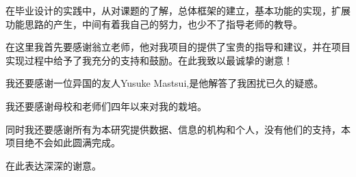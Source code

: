 
\acknowledgement

 
在毕业设计的实践中，从对课题的了解，总体框架的建立，基本功能的实现，扩展功能思路的产生，中间有着我自己的努力，也少不了指导老师的教导。

在这里我首先要感谢翁立老师，他对我项目的提供了宝贵的指导和建议，并在项目实现过程中给予了我充分的支持和鼓励。在此我致以最诚挚的谢意！

我还要感谢一位异国的友人Yusuke Mastsui,是他解答了我困扰已久的疑惑。

我还要感谢母校和老师们四年以来对我的栽培。

同时我还要感谢所有为本研究提供数据、信息的机构和个人，没有他们的支持，本项目绝不会如此圆满完成。

在此表达深深的谢意。